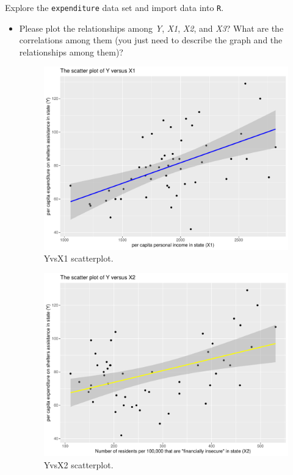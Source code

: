 \documentclass[12pt,letterpaper]{article}
\begin{document}
\vspace{.5cm}
\noindent Explore the \texttt{expenditure} data set and import data into \texttt{R}.
\vspace{.5cm}
  
\vspace{.5cm}
\begin{itemize}

\item
Please plot the relationships among \emph{Y}, \emph{X1}, \emph{X2}, and \emph{X3}? What are the correlations among them (you just need to describe the graph and the relationships among them)?
\vspace{1cm}

\begin{figure}[h!]\centering
	\caption{\footnotesize YvsX1 scatterplot.}
	\label{fig:plot_Y_vs_X1}
	\includegraphics[width=.75\textwidth]{Y_vs_X1_scatterplot.pdf}
\end{figure}
\begin{figure}[h!]\centering
	\caption{\footnotesize YvsX2 scatterplot.}
	\label{fig:plot_Y_vs_X2}
	\includegraphics[width=.75\textwidth]{Y_vs_X2_scatterplot.pdf}

\end{figure}
\end{itemize}
\end{document}
